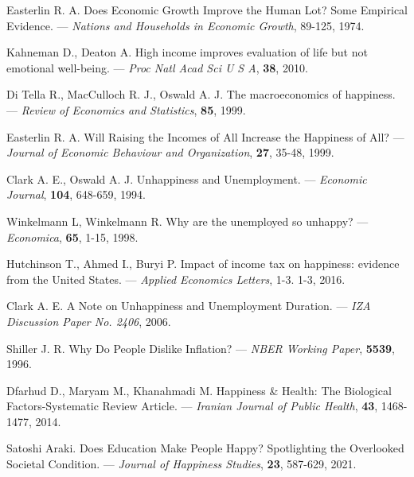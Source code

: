 \documentclass[russian]{vegareport}
\begin{document}
    \begin{thebibliography}{100}
            \bibitem{[1]} \label{Easterlin}
            Easterlin R. A.
            Does Economic Growth Improve the Human Lot? Some Empirical Evidence.
            --- \textit{Nations and Households in Economic Growth}, 
            89-125, 1974.

            \bibitem{} \label{KahnemanDeaton}
            Kahneman D., Deaton A. 
            High income improves evaluation of life but not emotional well-being. 
            --- \textit{Proc Natl Acad Sci U S A},
            \textbf{38}, 2010.

            \bibitem{} \label{DiTella}
            Di Tella R., MacCulloch R. J., Oswald A. J.
            The macroeconomics of happiness. 
           --- \textit{Review of Economics and Statistics}, 
            \textbf{85}, 1999. 

            \bibitem{} \label{Easterlin2}
            Easterlin R. A.
            Will Raising the Incomes of All Increase the Happiness of All?
            --- \textit{Journal of Economic Behaviour and Organization},
            \textbf{27}, 35-48, 1999. 

            \bibitem{} \label{Clark}
            Clark A. E., Oswald A. J.
            Unhappiness and Unemployment.
            --- \textit{Economic Journal}, 
            \textbf{104}, 648-659, 1994. 

            \bibitem{} \label{Winkelmann}
            Winkelmann L, Winkelmann R.
            Why are the unemployed so unhappy?
            --- \textit{Economica}, 
            \textbf{65}, 1-15, 1998. 

            \bibitem{} \label{tax}
            Hutchinson T., Ahmed I., Buryi P.
            Impact of income tax on happiness: evidence from the United States. 
            --- \textit{Applied Economics Letters}, 1-3.
            1-3, 2016.

            \bibitem{} \label{Clarkunemp}
            Clark A. E.
            A Note on Unhappiness and Unemployment Duration.
            --- \textit{IZA Discussion Paper No. 2406}, 
            2006. 
            
            \bibitem{} \label{Inflation}
            Shiller J. R.
            Why Do People Dislike Inflation?
            --- \textit{NBER Working Paper}, 
            \textbf{5539}, 1996. 

            \bibitem{} \label{medicine}
            Dfarhud D., Maryam M., Khanahmadi M. 
            Happiness & Health: The Biological Factors-Systematic Review Article.
            --- \textit{Iranian Journal of Public Health}, 
            \textbf{43}, 1468-1477, 2014. 

            \bibitem{} \label{Education}
            Satoshi Araki.
            Does Education Make People Happy? Spotlighting the Overlooked Societal Condition.
            --- \textit{Journal of Happiness Studies}, 
            \textbf{23}, 587-629, 2021. 
        \end{thebibliography}
\end{document}
